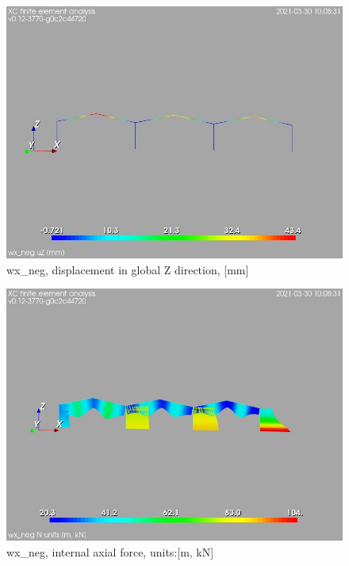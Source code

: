 \begin{figure}
\begin{center}
\includegraphics[width=\linewidth]{calc_results/sole_zeinali/text/graphics/resSimplLC/wx_negtotaluZ}
\caption{wx_neg, displacement in global Z direction, [mm]}
\end{center}
\end{figure}
\begin{figure}
\begin{center}
\includegraphics[width=\linewidth]{calc_results/sole_zeinali/text/graphics/resSimplLC/wx_negallMemberSetN}
\caption{wx_neg, internal axial force, units:[m, kN]}
\end{center}
\end{figure}
